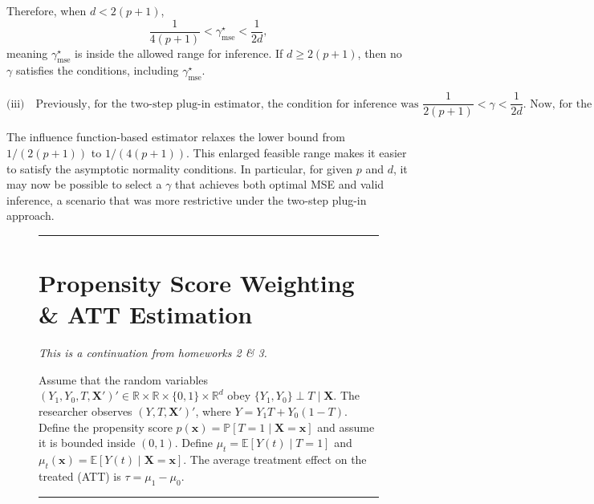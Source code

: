 \documentclass{article}
\newenvironment{colorparagraph}[1]{\par\color{#1}}{\par}
\begin{document}
Therefore, when \(d<2(p+1)\),
\[
\frac{1}{4(p+1)} < \gamma^\star_{\text{mse}} < \frac{1}{2d},
\]
meaning \(\gamma^\star_{\text{mse}}\) is inside the allowed range for inference. If \(d \ge 2(p+1)\), then no \(\gamma\) satisfies the conditions, including \(\gamma^\star_{\text{mse}}\).

\[
\text{(iii)} \quad \text{Previously, for the two-step plug-in estimator, the condition for inference was } \frac{1}{2(p+1)} < \gamma < \frac{1}{2d}.
\text{ Now, for the influence function-based estimator, the condition is } \frac{1}{4(p+1)} < \gamma < \frac{1}{2d}.
\]

The influence function-based estimator relaxes the lower bound from \(1/(2(p+1))\) to \(1/(4(p+1))\). This enlarged feasible range makes it easier to satisfy the asymptotic normality conditions. In particular, for given \(p\) and \(d\), it may now be possible to select a \(\gamma\) that achieves both optimal MSE and valid inference, a scenario that was more restrictive under the two-step plug-in approach.

\begin{figure}[H]
  \begin{colorparagraph}{questioncolor}
  \rule{\textwidth}{0.5pt}
  \label{q2}
  \section{Propensity Score Weighting \& ATT Estimation}

  \textit{This is a continuation from homeworks 2 \& 3.}

  Assume that the random variables \( (Y_1, Y_0, T, \mathbf{X}')' \in \mathbb{R} \times \mathbb{R} \times \{0, 1\} \times \mathbb{R}^d \) obey \( \{Y_1, Y_0\} \perp T \mid \mathbf{X} \). The researcher observes \( (Y, T, \mathbf{X}')' \), where \( Y = Y_1 T + Y_0 (1 - T) \). Define the propensity score \( p(\mathbf{x}) = \mathbb{P}[T = 1 \mid \mathbf{X} = \mathbf{x}] \) and assume it is bounded inside \( (0, 1) \). Define \( \mu_t = \mathbb{E}[Y(t) \mid T = 1] \) and \( \mu_t(\mathbf{x}) = \mathbb{E}[Y(t) \mid \mathbf{X} = \mathbf{x}] \). The average treatment effect on the treated (ATT) is \( \tau = \mu_1 - \mu_0 \).

  \rule{\textwidth}{0.5pt}
  \end{colorparagraph}
\end{figure}
\end{document}
